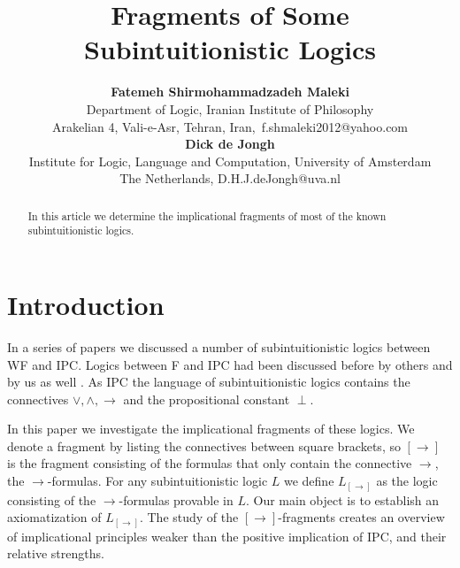 \documentclass[12pt]{article}
\begin{document}
\title{Fragments of Some Subintuitionistic Logics}

\author{\textbf{Fatemeh Shirmohammadzadeh Maleki}\\
Department of Logic, Iranian Institute of Philosophy\\
Arakelian 4, Vali-e-Asr, Tehran, Iran,~f.shmaleki2012@yahoo.com\\
\textbf{Dick de Jongh}\\
Institute for Logic, Language and Computation, University of Amsterdam\\
The Netherlands, D.H.J.deJongh@uva.nl}

\maketitle
\date{}
\begin{abstract} In this article we determine the implicational fragments of most of the known subintuitionistic logics.
\end{abstract}


\section{Introduction}

In a series of papers \cite{Dic,  DF2, Dic4, FD6, FD} we discussed a number of subintuitionistic logics between {\sf WF} and {\sf IPC}. 
Logics between {\sf F} and {\sf IPC} had been discussed before by others and by us as well \cite{Celani2, Co, Dic, DF2, a2}.
As {\sf IPC} the language of subintuitionistic logics contains the connectives $ \vee, \wedge, \rightarrow $  and the propositional constant $  \perp$.

In this paper we investigate the implicational fragments of these logics. We denote a fragment by listing the connectives between square brackets, so $ [\rightarrow] $ is the fragment consisting of the formulas that only contain the connective  $ \rightarrow $, the $ \rightarrow $-formulas. For any subintuitionistic logic $L$ we define $L_{[\rightarrow]} $ as the logic consisting of  the $ \rightarrow $-formulas provable in $ L$. Our main object is to establish an axiomatization of $L_{[\rightarrow]} $. The study of the $[\rightarrow]$-fragments creates an overview of implicational principles weaker than the positive implication of {\sf IPC}, and their relative strengths.
 
\end{document}
